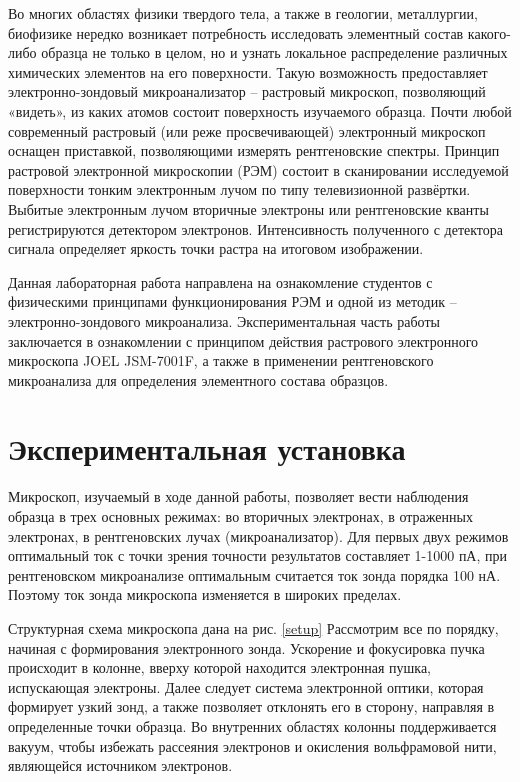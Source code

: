 \documentclass[a4paper,12pt]{article}
\begin{document}
Во многих областях физики твердого тела, а также в геологии,
металлургии, биофизике нередко возникает потребность исследовать
элементный состав какого-либо образца не только в целом, но и узнать
локальное распределение различных химических элементов на его
поверхности. Такую возможность предоставляет электронно-зондовый
микроанализатор – растровый микроскоп, позволяющий «видеть», из
каких атомов состоит поверхность изучаемого образца. Почти любой
современный растровый (или реже просвечивающей) электронный
микроскоп оснащен приставкой, позволяющими измерять рентгеновские
спектры. Принцип растровой электронной микроскопии (РЭМ) состоит в
сканировании исследуемой поверхности тонким электронным лучом по
типу телевизионной развёртки. Выбитые электронным лучом вторичные
электроны или рентгеновские кванты регистрируются детектором
электронов. Интенсивность полученного с детектора сигнала определяет
яркость точки растра на итоговом изображении. 

Данная лабораторная работа направлена на ознакомление студентов с
физическими принципами функционирования РЭМ и одной из методик –
электронно-зондового микроанализа. Экспериментальная часть работы
заключается в ознакомлении с принципом действия растрового
электронного микроскопа JOEL JSM-7001F, а также в применении
рентгеновского микроанализа для определения элементного состава
образцов.

\section{Экспериментальная установка}

Микроскоп, изучаемый в ходе данной работы, позволяет вести
наблюдения образца в трех основных режимах: во вторичных электронах,
в отраженных электронах, в рентгеновских лучах (микроанализатор). Для
первых двух режимов оптимальный ток с точки зрения точности
результатов составляет 1-1000 пА, при рентгеновском микроанализе
оптимальным считается ток зонда порядка 100 нА. Поэтому ток зонда
микроскопа изменяется в широких пределах.

Структурная схема микроскопа дана на рис. \ref{setup} Рассмотрим все по
порядку, начиная с формирования электронного зонда. Ускорение и
фокусировка пучка происходит в колонне, вверху которой находится
электронная пушка, испускающая электроны. Далее следует система
электронной оптики, которая формирует узкий зонд, а также позволяет
отклонять его в сторону, направляя в определенные точки образца. Во внутренних областях колонны поддерживается вакуум, чтобы избежать
рассеяния электронов и окисления вольфрамовой нити, являющейся
источником электронов.
\end{document}
